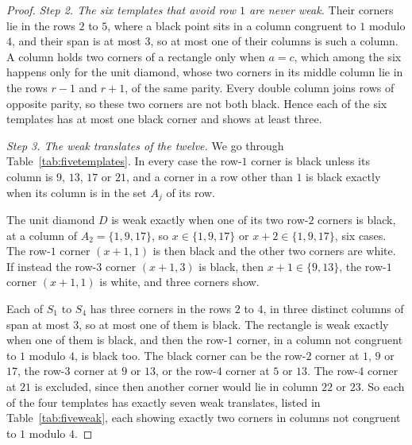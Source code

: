 \begin{proof}
\emph{Step 2. The six templates that avoid row $1$ are never weak.} Their corners lie in the
rows $2$ to $5$, where a black point sits in a column congruent to $1$ modulo $4$, and their
span is at most $3$, so at most one of their columns is such a column. A column holds two
corners of a rectangle only when $a=c$, which among the six happens only for the unit
diamond, whose two corners in its middle column lie in the rows $r-1$ and $r+1$, of the same
parity. Every double column joins rows of opposite parity, so these two corners are not both
black. Hence each of the six templates has at most one black corner and shows at least three.

\emph{Step 3. The weak translates of the twelve.} We go through Table~\ref{tab:fivetemplates}.
In every case the row-$1$ corner is black unless its column is $9$, $13$, $17$ or $21$, and a
corner in a row other than $1$ is black exactly when its column is in the set $A_j$ of its row.

The unit diamond $D$ is weak exactly when one of its two row-$2$ corners is black, at a column
of $A_2=\{1,9,17\}$, so $x\in\{1,9,17\}$ or $x+2\in\{1,9,17\}$, six cases. The row-$1$
corner $(x+1,1)$ is then black and the other two corners are white. If instead the row-$3$
corner $(x+1,3)$ is black, then $x+1\in\{9,13\}$, the row-$1$ corner $(x+1,1)$ is white, and
three corners show.

Each of $S_1$ to $S_4$ has three corners in the rows $2$ to $4$, in three distinct columns of
span at most $3$, so at most one of them is black. The rectangle is weak exactly when one of
them is black, and then the row-$1$ corner, in a column not congruent to $1$ modulo $4$, is
black too. The black corner can be the row-$2$ corner at $1$, $9$ or $17$, the row-$3$ corner
at $9$ or $13$, or the row-$4$ corner at $5$ or $13$. The row-$4$ corner at $21$ is excluded,
since then another corner would lie in column $22$ or $23$. So each of the four templates has
exactly seven weak translates, listed in Table~\ref{tab:fiveweak}, each showing exactly two
corners in columns not congruent to $1$ modulo $4$.


\end{proof}
